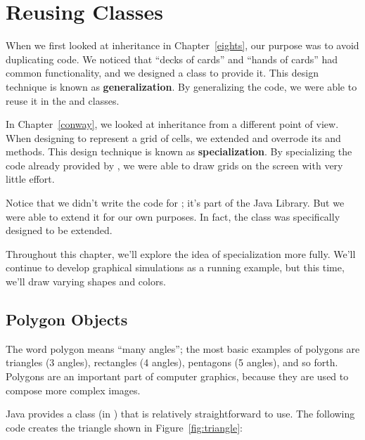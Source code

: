 \chapter{Reusing Classes}


When we first looked at inheritance in Chapter~\ref{eights}, our purpose was to avoid duplicating code.
We noticed that ``decks of cards'' and ``hands of cards'' had common functionality, and we designed a  class to provide it.
This design technique is known as {\bf generalization}.
By generalizing the code, we were able to reuse it in the  and  classes.

In Chapter~\ref{conway}, we looked at inheritance from a different point of view.
When designing  to represent a grid of cells, we extended  and overrode its  and  methods.
This design technique is known as {\bf specialization}.
By specializing the code already provided by , we were able to draw grids on the screen with very little effort.

Notice that we didn't write the code for ; it's part of the Java Library.
But we were able to extend it for our own purposes.
In fact, the  class was specifically designed to be extended.

Throughout this chapter, we'll explore the idea of specialization more fully.
We'll continue to develop graphical simulations as a running example, but this time, we'll draw varying shapes and colors.


\section{Polygon Objects}

The word polygon means ``many angles''; the most basic examples of polygons are triangles (3 angles), rectangles (4 angles), pentagons (5 angles), and so forth.
Polygons are an important part of computer graphics, because they are used to compose more complex images.

Java provides a  class (in ) that is relatively straightforward to use.
The following code creates the triangle shown in Figure~\ref{fig:triangle}:

